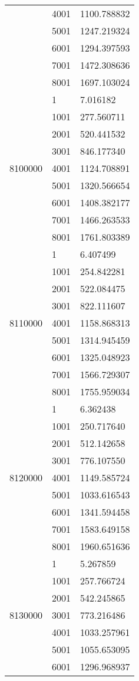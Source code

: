 \begin{table}[htb!]
\begin{tabular}{lll}
 & 4001 & 1100.788832 \\
 & 5001 & 1247.219324 \\
 & 6001 & 1294.397593 \\
 & 7001 & 1472.308636 \\
 & 8001 & 1697.103024 \\
\multirow[c]{9}{*}{8100000} & 1 & 7.016182 \\
 & 1001 & 277.560711 \\
 & 2001 & 520.441532 \\
 & 3001 & 846.177340 \\
 & 4001 & 1124.708891 \\
 & 5001 & 1320.566654 \\
 & 6001 & 1408.382177 \\
 & 7001 & 1466.263533 \\
 & 8001 & 1761.803389 \\
\multirow[c]{9}{*}{8110000} & 1 & 6.407499 \\
 & 1001 & 254.842281 \\
 & 2001 & 522.084475 \\
 & 3001 & 822.111607 \\
 & 4001 & 1158.868313 \\
 & 5001 & 1314.945459 \\
 & 6001 & 1325.048923 \\
 & 7001 & 1566.729307 \\
 & 8001 & 1755.959034 \\
\multirow[c]{9}{*}{8120000} & 1 & 6.362438 \\
 & 1001 & 250.717640 \\
 & 2001 & 512.142658 \\
 & 3001 & 776.107550 \\
 & 4001 & 1149.585724 \\
 & 5001 & 1033.616543 \\
 & 6001 & 1341.594458 \\
 & 7001 & 1583.649158 \\
 & 8001 & 1960.651636 \\
\multirow[c]{9}{*}{8130000} & 1 & 5.267859 \\
 & 1001 & 257.766724 \\
 & 2001 & 542.245865 \\
 & 3001 & 773.216486 \\
 & 4001 & 1033.257961 \\
 & 5001 & 1055.653095 \\
 & 6001 & 1296.968937 \\

\end{tabular}
\end{table}
